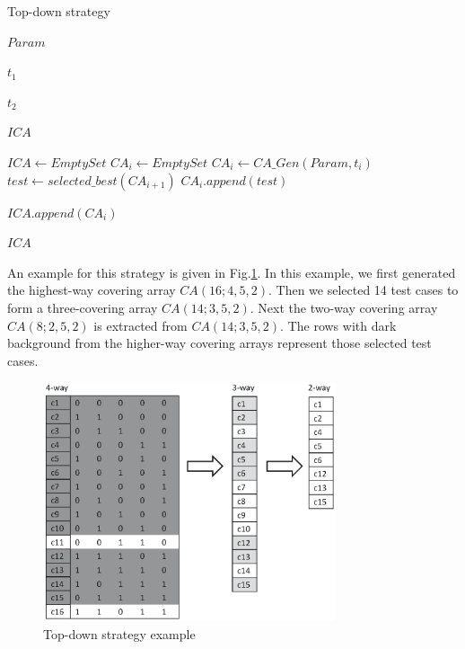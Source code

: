 \documentclass[conference]{IEEEtran}
\theoremstyle{definition}
\begin{document}
%
\begin{algorithm}
  \caption{Top-down strategy}
  \begin{algorithmic}[1]
    \Require
     $Param$ 

     $t_{1}$ 

     $t_{2}$ 

     \Ensure  $ICA$ 

      \State $ICA \leftarrow Empty Set$
         \State $CA_{i} \leftarrow  Empty Set $
                \State $CA_{i} \leftarrow CA\_Gen(Param, t_{i})$
         \Else
                \State $test \leftarrow selected\_best(CA_{i + 1})$
                \State $CA_{i}.append(test)$
             \EndWhile
        \EndIf

        \State $ICA.append(CA_{i})$
      \EndFor

     \State \Return $ICA$
  \end{algorithmic}
\end{algorithm}

An example for this strategy is given in Fig.\ref{decrease-example}. In this example, we first generated the highest-way covering array $CA(16; 4, 5, 2)$. Then we selected 14 test cases to form a three-covering array $CA(14; 3, 5, 2)$. Next the two-way covering array $CA(8; 2, 5, 2)$ is extracted from $CA(14; 3, 5, 2)$. The rows with dark background from the higher-way covering arrays represent those selected test cases.

\begin{figure}
 \includegraphics[width=3.4in]{decrease_example.eps}
\caption{Top-down strategy example}
\label{decrease-example}
\end{figure}
\end{document}
